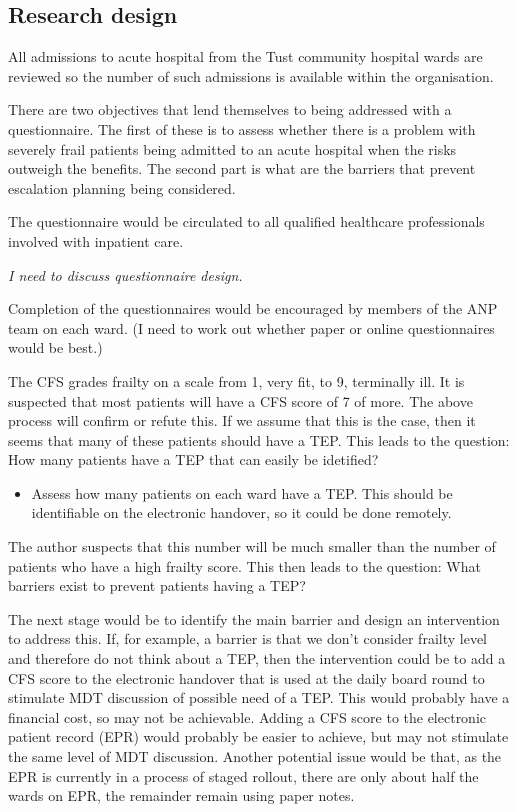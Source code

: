 \documentclass[12pt,a4paper,oneside,titlepage]{article}
\begin{document}
\subsection*{Research design}

All admissions to acute hospital from the Tust community hospital wards are reviewed
so the number of such admissions is available within the organisation.

There are two objectives that lend themselves to being addressed with a questionnaire.
The first of these is to assess whether there is a problem with severely frail 
patients being admitted to an acute hospital when the risks outweigh the benefits.
The second part is what are the barriers that prevent escalation planning 
being considered.

The questionnaire would be circulated to all qualified healthcare
professionals involved with inpatient care. 

\emph{I need to discuss questionnaire design.}

Completion of the questionnaires would be encouraged by members of the ANP team 
on each ward. (I need to work out whether paper or online questionnaires would be best.)

The CFS grades frailty on a scale from 1, very fit, to 9, terminally ill.
It is suspected that most patients will have a CFS score of 7 of more. The above process 
will confirm or refute this. If we assume that this is the case, then it seems
that many of these patients should have a TEP. This leads to the question: 
How many patients have a TEP that can easily be idetified?

\begin{itemize}

\item Assess how many patients on each ward have a TEP. This should be identifiable on 
	the electronic handover, so it could be done remotely.
\end{itemize}

The author suspects that this number will be much smaller than the number of patients 
who have a high frailty score. This then leads to the question: 
What barriers exist to prevent patients having a TEP?


The next stage would be to identify the main barrier and design an intervention to
address this. If, for example, a barrier is that we don't consider frailty level and
therefore do not think about a TEP, then the intervention could be to add a CFS score
to the electronic handover that is used at the daily board round to stimulate MDT
discussion of possible need of a TEP. This would probably have a financial cost, so
may not be achievable. Adding a CFS score to the electronic patient record (EPR) would 
probably be easier to achieve, but may not stimulate the same level of MDT discussion.
Another potential issue would be that, as the EPR is currently in a process of staged 
rollout, there are only about half the wards on EPR, the remainder remain using paper notes.
\end{document}
